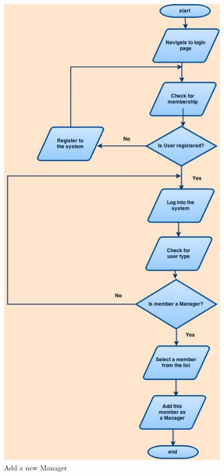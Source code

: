 \documentclass{l3proj}
\begin{document}
\pagebreak

{
\begin{figure}[h]
\caption{Add a new Manager}
\centering
\includegraphics[scale=0.30]{Manager(AddManager).jpg}
\end{figure}
}
\end{document}
